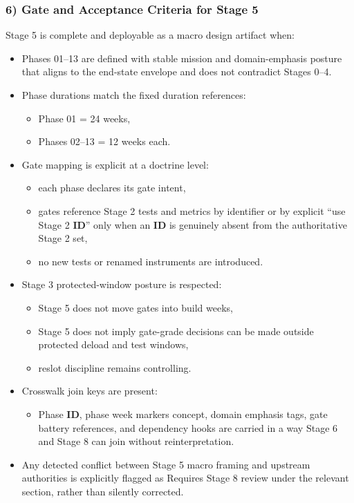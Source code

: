 \documentclass[10pt]{article}
\begin{document}
\subsubsection*{6) Gate and Acceptance Criteria for Stage 5}

Stage 5 is complete and deployable as a macro design artifact when:

\begin{itemize}
\item Phases 01–13 are defined with stable mission and domain-emphasis posture that aligns to the end-state envelope and does not contradict Stages 0–4.
\item Phase durations match the fixed duration references:
  \begin{itemize}
  \item Phase 01 = 24 weeks,
  \item Phases 02–13 = 12 weeks each.
  \end{itemize}
\item Gate mapping is explicit at a doctrine level:
  \begin{itemize}
  \item each phase declares its gate intent,
  \item gates reference Stage 2 tests and metrics by identifier or by explicit “use Stage 2 \textbf{ID}” only when an \textbf{ID} is genuinely absent from the authoritative Stage 2 set,
  \item no new tests or renamed instruments are introduced.
  \end{itemize}
\item Stage 3 protected-window posture is respected:
  \begin{itemize}
  \item Stage 5 does not move gates into build weeks,
  \item Stage 5 does not imply gate-grade decisions can be made outside protected deload and test windows,
  \item reslot discipline remains controlling.
  \end{itemize}
\item Crosswalk join keys are present:
  \begin{itemize}
  \item Phase \textbf{ID}, phase week markers concept, domain emphasis tags, gate battery references, and dependency hooks are carried in a way Stage 6 and Stage 8 can join without reinterpretation.
  \end{itemize}
\item Any detected conflict between Stage 5 macro framing and upstream authorities is explicitly flagged as Requires Stage 8 review under the relevant section, rather than silently corrected.
\end{itemize}
\end{document}
